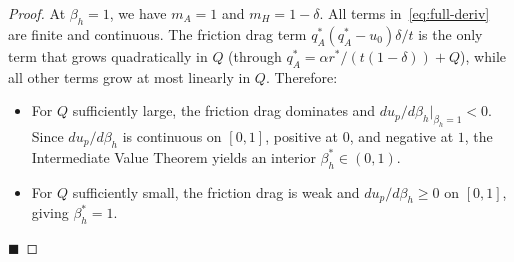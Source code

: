 \documentclass[mnsc,nonblindrev]{informs3_NoOR}
\begin{document}
\begin{proof}
At $\beta_h = 1$, we have $m_A = 1$ and $m_H = 1-\delta$. All terms in~\eqref{eq:full-deriv} are finite and continuous. The friction drag term $q_A^*(q_A^* - u_0)\delta/t$ is the only term that grows quadratically in $Q$ (through $q_A^* = \alpha r^*/(t(1-\delta)) + Q$), while all other terms grow at most linearly in $Q$. Therefore:
\begin{itemize}
\item For $Q$ sufficiently large, the friction drag dominates and $du_p/d\beta_h\big|_{\beta_h=1} < 0$. Since $du_p/d\beta_h$ is continuous on $[0,1]$, positive at $0$, and negative at $1$, the Intermediate Value Theorem yields an interior $\beta_h^* \in (0,1)$.
\item For $Q$ sufficiently small, the friction drag is weak and $du_p/d\beta_h \geq 0$ on $[0,1]$, giving $\beta_h^* = 1$.
\end{itemize}
\hfill $\blacksquare$
\end{proof}
\end{document}

